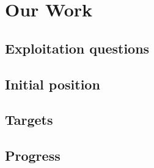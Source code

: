 \documentclass[11pt]{article}
\begin{document}
	\section{Our Work}
		\subsection{Exploitation questions}
		\subsection{Initial position}
		\subsection{Targets}
		
		\subsection{Progress}
		

	\nocite{*}
	
	
\end{document}
